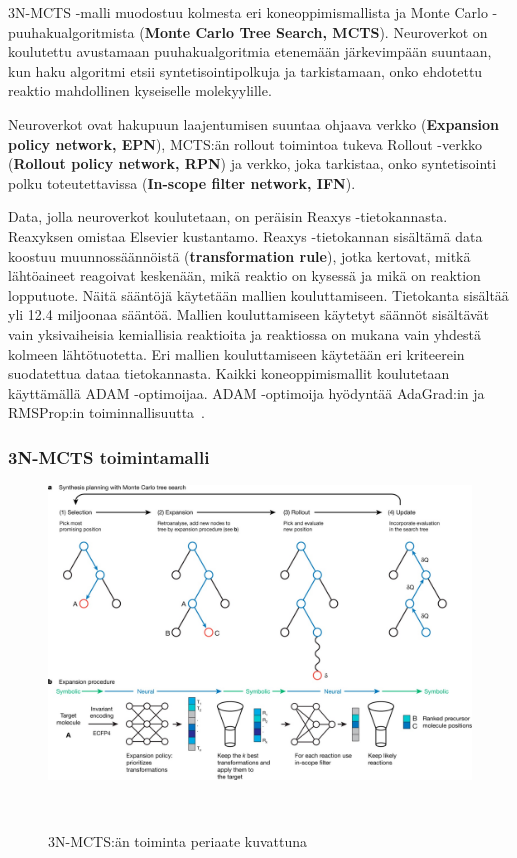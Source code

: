 \documentclass[finnish,twoside,censored,tkt,sw-line]{HYthesisML}
\begin{document}
3N-MCTS -malli muodostuu kolmesta eri koneoppimismallista ja Monte Carlo -puuhakualgoritmista (\textbf{Monte Carlo Tree Search, MCTS}).
Neuroverkot on koulutettu avustamaan puuhakualgoritmia etenemään järkevimpään suuntaan, kun haku algoritmi etsii syntetisointipolkuja ja tarkistamaan, onko ehdotettu reaktio mahdollinen kyseiselle molekyylille.

Neuroverkot ovat hakupuun laajentumisen suuntaa ohjaava verkko (\textbf{Expansion policy network, EPN}), MCTS:än rollout toimintoa tukeva Rollout -verkko (\textbf{Rollout policy network, RPN}) ja verkko, joka tarkistaa, onko syntetisointi polku toteutettavissa (\textbf{In-scope filter network, IFN}).

Data, jolla neuroverkot koulutetaan, on peräisin Reaxys -tietokannasta.
Reaxyksen omistaa Elsevier kustantamo.
Reaxys -tietokannan sisältämä data koostuu muunnossäännöistä (\textbf{transformation rule}), jotka kertovat, mitkä lähtöaineet reagoivat keskenään, mikä reaktio on kysessä ja mikä on reaktion lopputuote.
Näitä sääntöjä käytetään mallien kouluttamiseen.
Tietokanta sisältää yli 12.4 miljoonaa sääntöä.
Mallien kouluttamiseen käytetyt säännöt sisältävät vain yksivaiheisia kemiallisia reaktioita ja reaktiossa on mukana vain yhdestä kolmeen lähtötuotetta.
Eri mallien kouluttamiseen käytetään eri kriteerein suodatettua dataa tietokannasta.
Kaikki koneoppimismallit koulutetaan käyttämällä ADAM -optimoijaa.
ADAM -optimoija hyödyntää AdaGrad:in ja RMSProp:in toiminnallisuutta~\cite{kingma2017adam}.

\subsubsection{3N-MCTS toimintamalli}

\begin{figure}[ht]
    \centering
    \includegraphics[width=\textwidth]{3N-MCTS-fig.jpg}
    \caption{3N-MCTS:än toiminta periaate kuvattuna}
    {~\cite{SeglerMarwinHS2018Pcsw}}
\end{figure}
\end{document}
